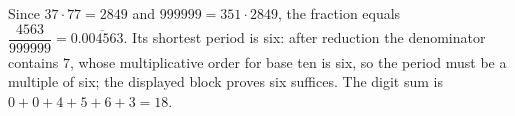 Since $37\cdot77=2849$ and $999999=351\cdot2849$, the fraction equals $\dfrac{4563}{999999}=0.\overline{004563}$. Its shortest period is six: after reduction the denominator contains $7$, whose multiplicative order for base ten is six, so the period must be a multiple of six; the displayed block proves six suffices. The digit sum is $0+0+4+5+6+3=\boxed{18}$.

